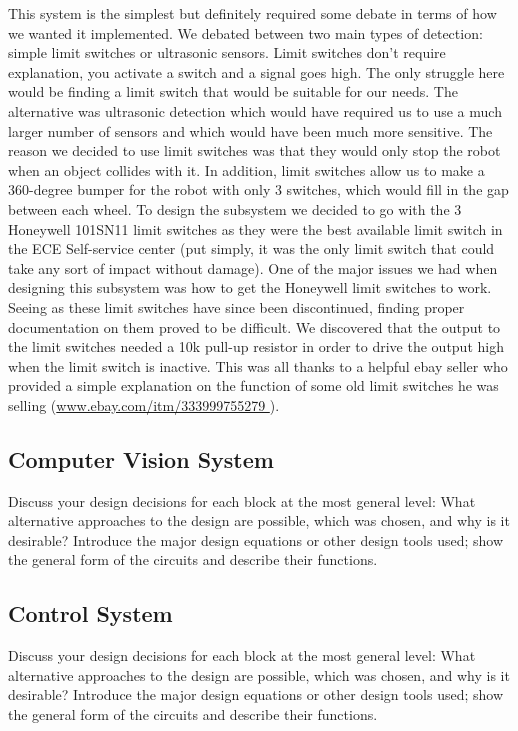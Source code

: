 \documentclass{report}
\begin{document}
    This system is the simplest but definitely required some debate in terms of how we wanted it implemented. We debated between two main types of detection: simple limit switches or ultrasonic sensors. Limit switches don't require explanation, you activate a switch and a signal goes high. The only struggle here would be finding a limit switch that would be suitable for our needs. The alternative was ultrasonic detection which would have required us to use a much larger number of sensors and which would have been much more sensitive. The reason we decided to use limit switches was that they would only stop the robot when an object collides with it. In addition, limit switches allow us to make a 360-degree bumper for the robot with only 3 switches, which would fill in the gap between each wheel. To design the subsystem we decided to go with the 3 Honeywell 101SN11 limit switches as they were the best available limit switch in the ECE Self-service center (put simply, it was the only limit switch that could take any sort of impact without damage). One of the major issues we had when designing this subsystem was how to get the Honeywell limit switches to work. Seeing as these limit switches have since been discontinued, finding proper documentation on them proved to be difficult. We discovered that the output to the limit switches needed a 10k pull-up resistor in order to drive the output high when the limit switch is inactive. This was all thanks to a helpful ebay seller who provided a simple explanation on the function of some old limit switches he was selling (\url{www.ebay.com/itm/333999755279 }).
    
    \subsection{Computer Vision System}
    Discuss your design decisions for each block at the most general level: What alternative approaches to the design are possible, which was chosen, and why is it desirable? Introduce the major design equations or other design tools used; show the general form of the circuits and describe their functions.
    
    \subsection{Control System}
    Discuss your design decisions for each block at the most general level: What alternative approaches to the design are possible, which was chosen, and why is it desirable? Introduce the major design equations or other design tools used; show the general form of the circuits and describe their functions.
    
\end{document}
